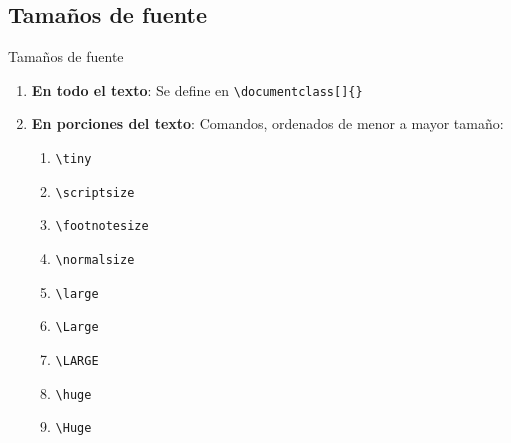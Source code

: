 \documentclass[../slides.tex]{subfiles}
\begin{document}
    \begin{frame}
        \tableofcontents[sections=\value{section}]
    \end{frame}
    
    \subsection{Tamaños de fuente}
    \begin{frame}{Tamaños de fuente}
        \begin{enumerate}
            \item \textbf{En todo el texto}: Se define en \texttt{\textbackslash documentclass[]\{\}}

            \item \textbf{En porciones del texto}:
                Comandos, ordenados de menor a mayor tamaño:
                \begin{enumerate}
                    \item \texttt{\textbackslash tiny}
                    \item \texttt{\textbackslash scriptsize}
                    \item \texttt{\textbackslash footnotesize}
                    \item \texttt{\textbackslash normalsize}
                    \item \texttt{\textbackslash large}
                    \item \texttt{\textbackslash Large}
                    \item \texttt{\textbackslash LARGE}
                    \item \texttt{\textbackslash huge}
                    \item \texttt{\textbackslash Huge}
                \end{enumerate}
                
        \end{enumerate}
    \end{frame}
        
\end{document}
